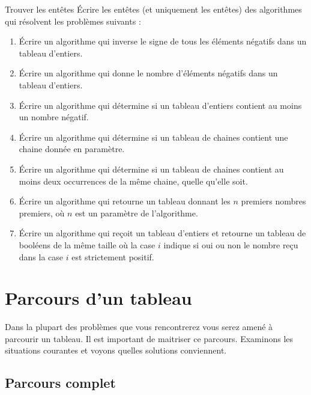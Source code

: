 			\begin{Exercice}{Trouver les entêtes}
				Écrire les entêtes (et uniquement les entêtes)
				des algorithmes qui résolvent les problèmes suivants :
				\begin{enumerate}[label=\alph*)]
				\item
					Écrire un algorithme qui 
					inverse le signe de tous les éléments négatifs dans un tableau d'entiers.
				\item
					Écrire un algorithme qui
					donne le nombre d'éléments négatifs dans un tableau d'entiers.
				\item
					Écrire un algorithme qui
					détermine si un tableau d'entiers contient au moins un nombre négatif.
				\item
					Écrire un algorithme qui
					détermine si un tableau de chaines contient
					une chaine donnée en paramètre.
				\item
					Écrire un algorithme qui
					détermine si un tableau de chaines contient
					au moins deux occurrences de la même chaine,
					quelle qu'elle soit.
				\item
					Écrire un algorithme qui 
					retourne un tableau donnant les $n$ premiers nombres premiers,
					où $n$ est un paramètre de l'algorithme.
				\item
					Écrire un algorithme qui 
					reçoit un tableau d'entiers
					et retourne un tableau de booléens de la même taille
					où la case $i$ indique si oui ou non
					le nombre reçu dans la case $i$ est strictement positif.
				\end{enumerate}
			\end{Exercice}
		
	\section{Parcours d'un tableau} 
	\label{Les parcours de tableaux}

		Dans la plupart des problèmes que vous rencontrerez
		vous serez amené à parcourir un tableau.
		Il est important de maitriser ce parcours.
		Examinons les situations courantes 
		et voyons quelles solutions conviennent.
	
		\subsection{Parcours complet}
		

